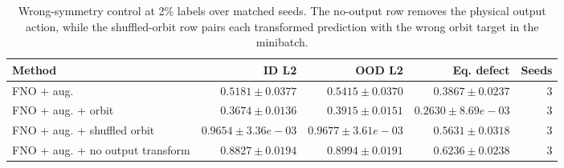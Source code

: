 \begin{table}[t]
\centering
\small
\caption{Wrong-symmetry control at 2\% labels over matched seeds. The no-output row removes the physical output action, while the shuffled-orbit row pairs each transformed prediction with the wrong orbit target in the minibatch.}
\label{tab:n64-wrong-symmetry-control}
\begin{tabular}{lrrrr}
\toprule
Method & ID L2 & OOD L2 & Eq. defect & Seeds \\
\midrule
FNO + aug. & \(0.5181\pm0.0377\) & \(0.5415\pm0.0370\) & \(0.3867\pm0.0237\) & 3 \\
FNO + aug. + orbit & \(0.3674\pm0.0136\) & \(0.3915\pm0.0151\) & \(0.2630\pm8.69e-03\) & 3 \\
FNO + aug. + shuffled orbit & \(0.9654\pm3.36e-03\) & \(0.9677\pm3.61e-03\) & \(0.5631\pm0.0318\) & 3 \\
FNO + aug. + no output transform & \(0.8827\pm0.0194\) & \(0.8994\pm0.0191\) & \(0.6236\pm0.0238\) & 3 \\
\bottomrule
\end{tabular}
\end{table}

